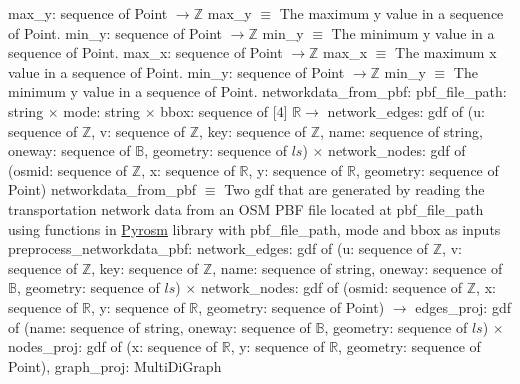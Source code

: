 \documentclass[12pt, titlepage]{article}
\begin{document}
max\_y: sequence of Point $\rightarrow \mathbb{Z}$ \newline
max\_y $\equiv$ The maximum y value in a sequence of Point.\newline\newline
min\_y: sequence of Point $\rightarrow \mathbb{Z}$ \newline
min\_y $\equiv$ The minimum y value in a sequence of Point.\newline\newline
max\_x: sequence of Point $\rightarrow \mathbb{Z}$ \newline
max\_x $\equiv$ The maximum x value in a sequence of Point.\newline\newline
min\_y: sequence of Point $\rightarrow \mathbb{Z}$ \newline
min\_y $\equiv$ The minimum y value in a sequence of Point.\newline\newline
networkdata\_from\_pbf:\newline 
pbf\_file\_path: string $\times$ mode: string $\times$ bbox: sequence of [4] $\mathbb{R} \rightarrow$ network\_edges: gdf of (u: sequence of $\mathbb{Z}$, v: sequence of $\mathbb{Z}$, key: sequence of $\mathbb{Z}$, name: sequence of string, oneway: sequence of $\mathbb{B}$, geometry: sequence of $ls$) 
$\times$ network\_nodes: gdf of (osmid: sequence of $\mathbb{Z}$, x: sequence of $\mathbb{R}$, y: sequence of $\mathbb{R}$, geometry: sequence of Point)\newline
networkdata\_from\_pbf $\equiv$ Two gdf that are generated by reading the transportation network data from an OSM PBF file located at pbf\_file\_path using functions in \href{https://pyrosm.readthedocs.io/en/latest/basics.html#read-street-networks}{Pyrosm} library with pbf\_file\_path, mode and bbox as inputs\newline\newline
preprocess\_networkdata\_pbf:\newline
network\_edges: gdf of (u: sequence of $\mathbb{Z}$, v: sequence of $\mathbb{Z}$, key: sequence of $\mathbb{Z}$, name: sequence of string, oneway: sequence of $\mathbb{B}$, geometry: sequence of $ls$) $\times$ network\_nodes: gdf of (osmid: sequence of $\mathbb{Z}$, x: sequence of $\mathbb{R}$, y: sequence of $\mathbb{R}$, geometry: sequence of Point) \newline$\rightarrow$ \newline edges\_proj: gdf of (name: sequence of string, oneway: sequence of $\mathbb{B}$, geometry: sequence of $ls$) $\times$ nodes\_proj: gdf of (x: sequence of $\mathbb{R}$, y: sequence of $\mathbb{R}$, geometry: sequence of Point), graph\_proj: MultiDiGraph\newline
\end{document}
